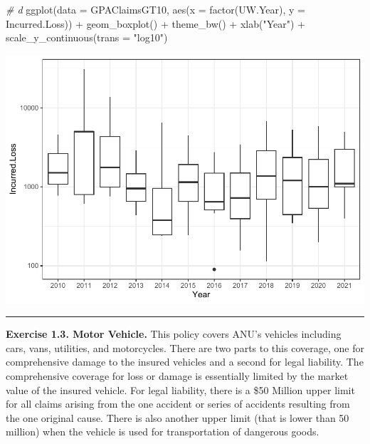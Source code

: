 \documentclass[
]{book}
\newenvironment{Shaded}{\begin{snugshade}}{\end{snugshade}}
\newcommand{\AttributeTok}[1]{\textcolor[rgb]{0.77,0.63,0.00}{#1}}
\newcommand{\CommentTok}[1]{\textcolor[rgb]{0.56,0.35,0.01}{\textit{#1}}}
\newcommand{\FunctionTok}[1]{\textcolor[rgb]{0.00,0.00,0.00}{#1}}
\newcommand{\NormalTok}[1]{#1}
\newcommand{\SpecialCharTok}[1]{\textcolor[rgb]{0.00,0.00,0.00}{#1}}
\newcommand{\StringTok}[1]{\textcolor[rgb]{0.31,0.60,0.02}{#1}}
\begin{document}
\begin{Shaded}
\begin{Highlighting}[]
\CommentTok{\# d}
\FunctionTok{ggplot}\NormalTok{(}\AttributeTok{data =}\NormalTok{ GPAClaimsGT10, }\FunctionTok{aes}\NormalTok{(}\AttributeTok{x =} \FunctionTok{factor}\NormalTok{(UW.Year), }\AttributeTok{y =}\NormalTok{ Incurred.Loss)) }\SpecialCharTok{+} \FunctionTok{geom\_boxplot}\NormalTok{() }\SpecialCharTok{+}
    \FunctionTok{theme\_bw}\NormalTok{() }\SpecialCharTok{+} \FunctionTok{xlab}\NormalTok{(}\StringTok{"Year"}\NormalTok{) }\SpecialCharTok{+} \FunctionTok{scale\_y\_continuous}\NormalTok{(}\AttributeTok{trans =} \StringTok{"log10"}\NormalTok{)}
\end{Highlighting}
\end{Shaded}

\begin{center}\includegraphics{LossDataAnalytics_files/figure-latex/unnamed-chunk-20-2} \end{center}

\begin{center}\rule{0.5\linewidth}{0.5pt}\end{center}

\textbf{Exercise 1.3. Motor Vehicle.} This policy covers ANU's vehicles including cars, vans, utilities, and motorcycles. There are two parts to this coverage, one for comprehensive damage to the insured vehicles and a second for legal liability. The comprehensive coverage for loss or damage is essentially limited by the market value of the insured vehicle. For legal liability, there is a \$50 Million upper limit for all claims arising from the one accident or series of accidents resulting from the one original cause. There is also another upper limit (that is lower than 50 million) when the vehicle is used for transportation of dangerous goods.
\end{document}
